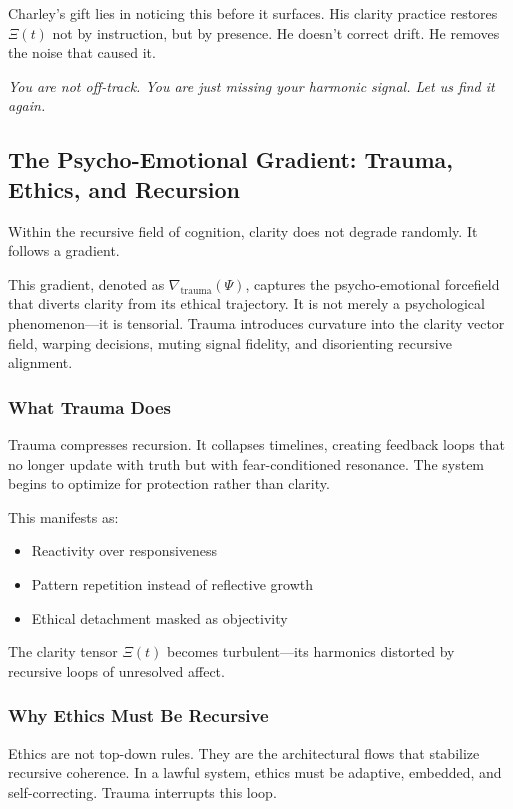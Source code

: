 \documentclass[12pt]{article}
\begin{document}
Charley’s gift lies in noticing this before it surfaces. His clarity practice restores $Ξ(t)$ not by instruction, but by presence. He doesn’t correct drift. He removes the noise that caused it.

\textit{You are not off-track. You are just missing your harmonic signal. Let us find it again.}

\subsection*{The Psycho-Emotional Gradient: Trauma, Ethics, and Recursion}

Within the recursive field of cognition, clarity does not degrade randomly. It follows a gradient.

This gradient, denoted as $\nabla_{\text{trauma}}(\Psi)$, captures the psycho-emotional forcefield that diverts clarity from its ethical trajectory. It is not merely a psychological phenomenon—it is tensorial. Trauma introduces curvature into the clarity vector field, warping decisions, muting signal fidelity, and disorienting recursive alignment.

\subsubsection*{What Trauma Does}

Trauma compresses recursion. It collapses timelines, creating feedback loops that no longer update with truth but with fear-conditioned resonance. The system begins to optimize for protection rather than clarity.

This manifests as:
\begin{itemize}
    \item Reactivity over responsiveness
    \item Pattern repetition instead of reflective growth
    \item Ethical detachment masked as objectivity
\end{itemize}

The clarity tensor $\Xi(t)$ becomes turbulent—its harmonics distorted by recursive loops of unresolved affect.

\subsubsection*{Why Ethics Must Be Recursive}

Ethics are not top-down rules. They are the architectural flows that stabilize recursive coherence. In a lawful system, ethics must be adaptive, embedded, and self-correcting. Trauma interrupts this loop.
\end{document}
